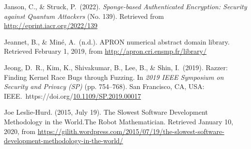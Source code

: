 \documentclass[12pt,twoside]{article}
\begin{document}
{\begin{thebibliography}{1079}
\mdbibitemlabel{}Janson, C., \& Struck, P.~(2022). \emph{Sponge-based Authenticated Encryption: Security against Quantum Attackers} (No. 139). Retrieved from \href{http://eprint.iacr.org/2022/139}{{\ttfamily http://\hspace{0pt}eprint.\hspace{0pt}iacr.\hspace{0pt}org/\hspace{0pt}2022/\hspace{0pt}139}}%

\mdbibitemlabel{}Jeannet, B., \& Miné, A.~(n.d.). APRON numerical abstract domain library. Retrieved February 1, 2019, from \href{http://apron.cri.ensmp.fr/library/}{{\ttfamily http://\hspace{0pt}apron.\hspace{0pt}cri.\hspace{0pt}ensmp.\hspace{0pt}fr/\hspace{0pt}library/\hspace{0pt}}}%

\mdbibitemlabel{}Jeong, D.~R., Kim, K., Shivakumar, B., Lee, B., \& Shin, I.~(2019). Razzer: Finding Kernel Race Bugs through Fuzzing. In \emph{2019 IEEE Symposium on Security and Privacy (SP)} (pp. 754–768). San Francisco, CA, USA: IEEE.~https://doi.org/\href{https://dx.doi.org/10.1109/SP.2019.00017}{10.1109/SP.2019.00017}%

\mdbibitemlabel{}Joe Leslie-Hurd. (2015, July 19). The Slowest Software Development Methodology in the World.The Robot Mathematician. Retrieved January 10, 2020, from \href{https://gilith.wordpress.com/2015/07/19/the-slowest-software-development-methodology-in-the-world/}{{\ttfamily https://\hspace{0pt}gilith.\hspace{0pt}wordpress.\hspace{0pt}com/\hspace{0pt}2015/\hspace{0pt}07/\hspace{0pt}19/\hspace{0pt}the-\hspace{0pt}slowest-\hspace{0pt}software-\hspace{0pt}development-\hspace{0pt}methodology-\hspace{0pt}in-\hspace{0pt}the-\hspace{0pt}world/\hspace{0pt}}}%


\end{thebibliography}}
\end{document}
